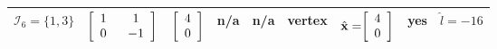 \documentclass[9pt,twocolumn,twoside,lineno]{pnas-new-1}
\newcommand{\bfx}{{\bf x}}
\newcommand{\calI}{{\mathcal I}}
\theoremstyle{remark}
\begin{document}
\begin{landscape}
\begin{table}[htbp]
\begin{threeparttable}[tbhp]
\begin{tabular}{l l l l l l l l l}
$\calI_6=\{1,3\}$ & \hspace{-0.1cm}$\left[ \renewcommand{\arraystretch}{1} \begin{array}{cc} 1 & ~~1 \\ 0 & ~~{-1} \end{array}\right]$ & \hspace{-0.1cm}$\left[ \renewcommand{\arraystretch}{1} \begin{array}{c} 4 \\ 0 \end{array}\right]$ & \hspace{-0.05cm}n/a & n/a & vertex & $\hat\bfx=\hspace{-0.1cm}\left[ \renewcommand{\arraystretch}{1} \begin{array}{c} 4 \\ 0 \end{array}\right]$ & yes & $\hat l=-16$ \vspace{0.2cm} \\
\hline
\end{tabular}
\label{Table_Ex_QP_Nonsingular}
\end{threeparttable}
\end{table}
\end{landscape}
\end{document}
